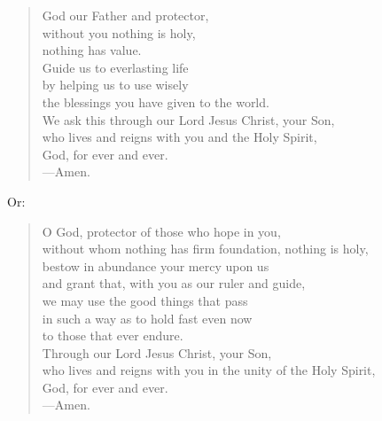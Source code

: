 \prayer

\setlength{\leftmargini}{\prayerleftmargini}

\begin{verse}
God our Father and protector,\\
without you nothing is holy,\\
nothing has value.\\
Guide us to everlasting life\\
by helping us to use wisely\\
the blessings you have given to the world.\\
We ask this through our Lord Jesus Christ, your Son,\\
who lives and reigns with you and the Holy Spirit,\\
God, for ever and ever.\\
{\color{red}---\thinspace}Amen.
\end{verse}

Or:

\begin{verse}
O God, protector of those who hope in you,\\
without whom nothing has firm foundation, nothing is holy,\\
bestow in abundance your mercy upon us\\
and grant that, with you as our ruler and guide,\\
we may use the good things that pass\\
in such a way as to hold fast even now\\
to those that ever endure.\\
Through our Lord Jesus Christ, your Son,\\
who lives and reigns with you in the unity of the Holy Spirit,\\
God, for ever and ever.\\
{\color{red}---\thinspace}Amen.
\end{verse}

\setlength{\leftmargini}{\defleftmargini}
